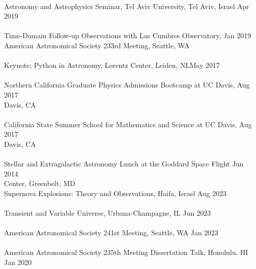 \documentclass[10pt]{cv}
\begin{document}
\begin{llist}
\\
Astronomy and Astrophysics Seminar, Tel Aviv University, Tel Aviv, Israel \hfill Apr 2019\\ \vspace{-0.1in}  %
\\
Time-Domain Follow-up Observations with Las Cumbres Observatory,   \hfill Jan 2019\\ 
American Astronomical Society 233rd Meeting, Seattle, WA \\ \vspace{-0.1in}  %
\\
Keynote; Python in Astronomy, Lorentz Center, Leiden, NL\hfill May 2017\\ \vspace{-0.1in}  %
\\
Northern California Graduate Physics Admissions Bootcamp at UC Davis, \hfill Aug 2017\\ 
Davis, CA\\ \vspace{-0.1in}  %
\\
California State Summer School for Mathematics and Science at UC Davis, \hfill Aug 2017\\ 
 Davis, CA \\ \vspace{-0.1in}  %
\\
Stellar and Extragalactic Astronomy Lunch at the Goddard Space Flight  \hfill Jun 2014\\  
Center, Greenbelt, MD \\ \vspace{-0.1in}  %
\vspace{-0.1in}  
Supernova Explosions: Theory and Observations, Haifa, Israel \hfill Aug 2023 \\\vspace{-0.1in}
\\
Transient and Variable Universe, Urbana-Champagne, IL \hfill Jun 2023 \\\vspace{-0.1in}
\\
American Astronomical Society 241st Meeting, Seattle, WA \hfill Jan 2023\\\vspace{-0.1in} 
\\
American Astronomical Society 235th Meeting Dissertation Talk, Honolulu, HI \hfill Jan 2020\\ \vspace{-0.1in} 

\end{llist}
\end{document}
